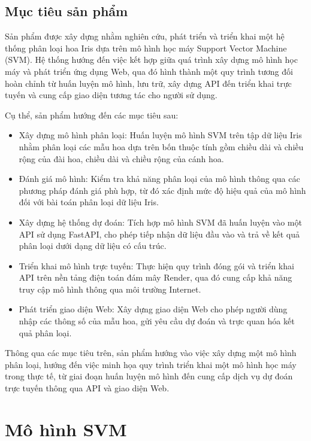 \documentclass[12pt,a4paper]{report}
\begin{document}
	\section{Mục tiêu sản phẩm}
	
	Sản phẩm được xây dựng nhằm nghiên cứu, phát triển và triển khai một hệ thống phân loại hoa Iris dựa trên mô hình học máy Support Vector Machine (SVM). Hệ thống hướng đến việc kết hợp giữa quá trình xây dựng mô hình học máy và phát triển ứng dụng Web, qua đó hình thành một quy trình tương đối hoàn chỉnh từ huấn luyện mô hình, lưu trữ, xây dựng API đến triển khai trực tuyến và cung cấp giao diện tương tác cho người sử dụng.
	
	\noindent
	Cụ thể, sản phẩm hướng đến các mục tiêu sau:
	
	\begin{itemize}
		\item Xây dựng mô hình phân loại: Huấn luyện mô hình SVM trên tập dữ liệu Iris nhằm phân loại các mẫu hoa dựa trên bốn thuộc tính gồm chiều dài và chiều rộng của đài hoa, chiều dài và chiều rộng của cánh hoa.
		\item Đánh giá mô hình: Kiểm tra khả năng phân loại của mô hình thông qua các phương pháp đánh giá phù hợp, từ đó xác định mức độ hiệu quả của mô hình đối với bài toán phân loại dữ liệu Iris.
		\item 	Xây dựng hệ thống dự đoán: Tích hợp mô hình SVM đã huấn luyện vào một API sử dụng FastAPI, cho phép tiếp nhận dữ liệu đầu vào và trả về kết quả phân loại dưới dạng dữ liệu có cấu trúc.
		\item Triển khai mô hình trực tuyến: Thực hiện quy trình đóng gói và triển khai API trên nền tảng điện toán đám mây Render, qua đó cung cấp khả năng truy cập mô hình thông qua môi trường Internet. 
		\item Phát triển giao diện Web: Xây dựng giao diện Web cho phép người dùng nhập các thông số của mẫu hoa, gửi yêu cầu dự đoán và trực quan hóa kết quả phân loại.
	\end{itemize}
	
	
	Thông qua các mục tiêu trên, sản phẩm hướng vào việc xây dựng một mô hình phân loại, hướng đến việc minh họa quy trình triển khai một mô hình học máy trong thực tế, từ giai đoạn huấn luyện mô hình đến cung cấp dịch vụ dự đoán trực tuyến thông qua API và giao diện Web.
	
	
	\chapter{Mô hình SVM}
	
\end{document}
